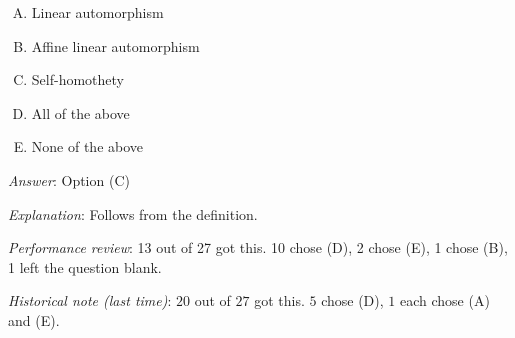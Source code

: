 \documentclass[10pt]{amsart}
\begin{document}
\begin{enumerate}
  \begin{enumerate}[(A)]
  \item Linear automorphism
  \item Affine linear automorphism
  \item Self-homothety
  \item All of the above
  \item None of the above
  \end{enumerate}

  {\em Answer}: Option (C)

  {\em Explanation}: Follows from the definition.

  {\em Performance review}: 13 out of 27 got this. 10 chose (D), 2
  chose (E), 1 chose (B), 1 left the question blank.

  {\em Historical note (last time)}: $20$ out of $27$ got this. $5$ chose (D),
  $1$ each chose (A) and (E).
\end{enumerate}
\end{document}
